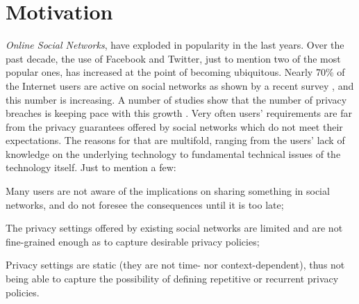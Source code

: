 \vspace{-2mm}
\section{Motivation}
\label{sec:motivation}

{\em Online Social Networks}, have exploded in popularity in the last years.
Over the past decade, the use of Facebook and Twitter, just to mention two of the most popular ones, has increased at the point of becoming ubiquitous.
Nearly 70\% of the Internet users are active on social networks as shown by a recent survey \cite{SNSuse}, and this number is increasing.
A number of studies show that the number of privacy breaches is keeping pace with this growth \cite{MJB12spse+,JEM12fpc,YKBA11afps+,MJB11fosn+}.
Very often users' requirements are far from the privacy guarantees offered by social networks  which do not meet their expectations. The reasons for that are multifold, ranging from the users' lack of knowledge on the underlying technology to fundamental technical issues of the technology itself. Just to mention a few:
\begin{inparaenum}[i)]
\item Many users are not aware of the implications on sharing something in social networks, and do not foresee the consequences until it is too late;
\item The privacy settings offered by existing social networks are limited and are not fine-grained enough as to capture desirable privacy policies;
\item Privacy settings are static (they are not time- nor context-dependent), thus not being able to capture the possibility of defining repetitive or recurrent privacy policies.
\end{inparaenum}

